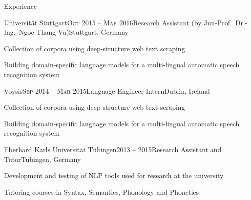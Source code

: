 \documentclass{resume} %
\begin{document}
\begin{rSection}{Experience}

\begin{rSubsection}{Universität Stuttgart}{\textsc{Oct} 2015 -- \textsc{Mar} 2016}{Research Assistant (by Jun-Prof.\ Dr.-Ing.\ Ngoc Thang Vu)}{Stuttgart, Germany}
	\setlength{\itemindent}{.7cm}
	
	\item Collection of corpora using deep-structure web text scraping
	
	\item Building domain-specific language models for a multi-lingual automatic speech recognition system 
\end{rSubsection}

\begin{rSubsection}{Voysis}{\textsc{Sep} 2014 -- \textsc{Mar} 2015}{Language Engineer Intern}{Dublin, Ireland}
	\setlength{\itemindent}{.7cm}
	
	\item Collection of corpora using deep-structure web text scraping
	
	\item Building domain-specific language models for a multi-lingual automatic speech recognition system 
\end{rSubsection}

\begin{rSubsection}{Eberhard Karls Universität Tübingen}{2013 -- 2015}{Research Assistant and Tutor}{Tübingen, Germany}
	\setlength{\itemindent}{.7cm}
	
	\item Development and testing of NLP tools used for research at the university
	
	\item Tutoring courses in Syntax, Semantics, Phonology and Phonetics 
\end{rSubsection}

%	
%	


\end{rSection}
\end{document}
